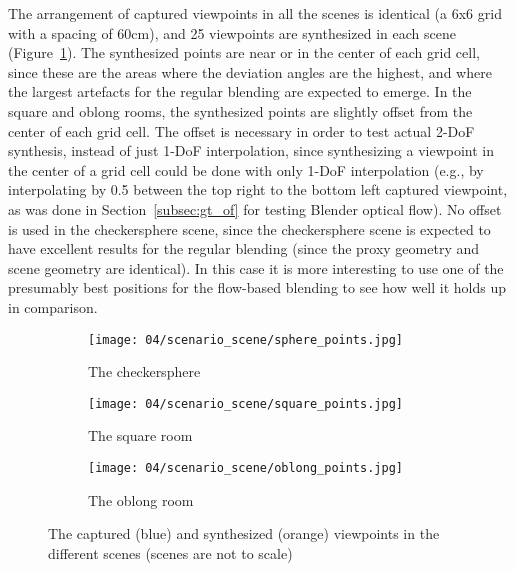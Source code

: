 The arrangement of captured viewpoints in all the scenes is identical (a 6x6 grid with a spacing of 60cm), and 25 viewpoints are synthesized in each scene (Figure~\ref{fig:scene_setup}). The synthesized points are near or in the center of each grid cell, since these are the areas where the deviation angles are the highest, and where the largest artefacts for the regular blending are expected to emerge. In the square and oblong rooms, the synthesized points are slightly offset from the center of each grid cell.
The offset is necessary in order to test actual 2-DoF synthesis, instead of just 1-DoF interpolation, since synthesizing a viewpoint in the center of a grid cell could be done with only 1-DoF interpolation (e.g., by interpolating by 0.5 between the top right to the bottom left captured viewpoint, as was done in Section~\ref{subsec:gt_of} for testing Blender optical flow). No offset is used in the checkersphere scene, since the checkersphere scene is expected to have excellent results for the regular blending (since the proxy geometry and scene geometry are identical). In this case it is more interesting to use one of the presumably best positions for the flow-based blending to see how well it holds up in comparison.

\begin{figure}
\centering
    \hfill
    \begin{subfigure}[b]{0.4\textwidth}
            \centering
            \texttt{[image: 04/scenario\_scene/sphere\_points.jpg]}
            \caption{The checkersphere}
    \end{subfigure}%
    \hfill
    \begin{subfigure}[b]{0.4\textwidth}
            \centering
            \texttt{[image: 04/scenario\_scene/square\_points.jpg]}
            \caption{The square room}
    \end{subfigure}
    \hfill
    \hfill

    \hfill
    \begin{subfigure}[b]{0.4\textwidth}
            \centering
            \texttt{[image: 04/scenario\_scene/oblong\_points.jpg]}
            \caption{The oblong room}
    \end{subfigure}%
    \hfill
    \hfill
  \caption[The captured and synthesized viewpoints in the different scenes]{The captured (blue) and synthesized (orange) viewpoints in the different scenes (scenes are not to scale)} \label{fig:scene_setup}
\end{figure}

